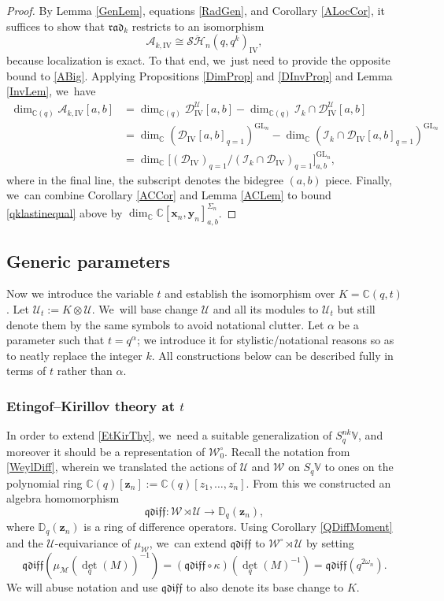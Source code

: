 \documentclass[11pt]{article}
\newcommand{\GL}{\mathrm{GL}}
\theoremstyle{definition}
\newcommand{\CC}{\mathbb{C}}
\newcommand{\UU}{\mathcal{U}}
\newcommand{\DD}{\mathcal{D}}
\newcommand{\WW}{\mathcal{W}}
\newcommand{\AAA}{\mathcal{A}}
\newcommand{\WWo}{\WW^\circ}
\newcommand{\MM}{\mathcal{M}}
\newcommand{\SHH}{\mathcal{S}\ddot{\mathcal{H}}}
\begin{document}
\begin{proof}
By Lemma \ref{GenLem}, equations \eqref{RadGen}, and Corollary \ref{ALocCor}, it suffices to show that $\mathfrak{rad}_k$ restricts to an isomorphism
\[
\AAA_{k,\mathrm{IV}}\cong\SHH_n(q,q^k)_{\mathrm{IV}},
\]
because localization is exact.
To that end, we~just need to provide the opposite bound to \eqref{ABig}.
Applying Propositions \ref{DimProp} and \ref{DInvProp} and Lemma \ref{InvLem}, we~have
\begin{align}
\dim_{\CC(q)}\AAA_{k,\mathrm{IV}}[a,b]&=\dim_{\CC(q)}\DD_{\mathrm{IV}}^\UU[a,b]-\dim_{\CC(q)}\mathcal{I}_k\cap\DD_{\mathrm{IV}}^\UU[a,b]\nonumber\\
&= \dim_{\CC}\left(\DD_{\mathrm{IV}}[a,b]_{q=1} \right)^{\GL_n}-\dim_{\CC}\left(\mathcal{I}_k\cap\DD_{\mathrm{IV}}[a,b]_{q=1}\right)^{\GL_n}\nonumber\\
&= \dim_{\CC}\bigl[ \left(\DD_{\mathrm{IV}}\right)_{q=1}\big/(\mathcal{I}_k\cap\DD_{\mathrm{IV}})_{q=1} \bigr]^{\GL_n}_{a,b},\label{qklastinequal}
\end{align}
where in the final line, the subscript denotes the bidegree $(a,b)$ piece.
Finally, we~can combine Corollary \ref{ACCor} and Lemma \ref{ACLem} to bound \eqref{qklastinequal} above by $\dim_\CC\CC[\boldsymbol{x}_n,\boldsymbol{y}_n]_{a,b}^{\Sigma_n}$.
\end{proof}

\subsection{Generic parameters}\label{GenPar}
Now we introduce the variable $t$ and establish the isomorphism over $K=\CC(q,t)$.
Let $\UU_t:=K\otimes\UU$. We~will base change $\UU$ and all its modules to $\UU_t$ but still denote them by the same symbols to avoid notational clutter.
Let $\alpha$ be a parameter such that $t=q^\alpha$; we introduce it for stylistic/notational reasons so as to neatly replace the integer $k$.
All constructions below can be described fully in terms of $t$ rather than $\alpha$.

\subsubsection{Etingof--Kirillov theory at $t$}
In order to extend \ref{EtKirThy}, we~need a suitable generalization of $S_q^{nk}\mathbb{V}$, and moreover it should be a representation of $\WWo_0$.
Recall the notation from \ref{WeylDiff}, wherein we translated the actions of $\UU$ and $\WW$ on $S_q\mathbb{V}$ to ones on the polynomial ring $\CC(q)[\boldsymbol{z}_n]:=\CC(q)[z_1,\ldots,z_n]$.
From this we constructed an algebra homomorphism
\[
\mathfrak{qdiff}:\WW\rtimes\UU\to\mathbb{D}_q(\boldsymbol{z}_n),
\]
where $\mathbb{D}_q(\boldsymbol{z}_n)$ is a ring of difference operators.
Using Corollary \ref{QDiffMoment} and the $\UU$\nobreakdash-equi\-variance of $\mu_\WW$, we~can extend $\mathfrak{qdiff}$ to $\WWo\rtimes\UU$ by setting
\[
\mathfrak{qdiff}(\mu_\MM(\textstyle\det_q(M))^{-1})=(\mathfrak{qdiff}\circ\kappa)(\textstyle\det_q(M)^{-1})=\mathfrak{qdiff}(q^{2\omega_n}).
\]
We will abuse notation and use $\mathfrak{qdiff}$ to also denote its base change to $K$.
\end{document}
